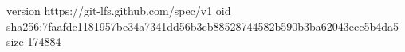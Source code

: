version https://git-lfs.github.com/spec/v1
oid sha256:7faafde1181957be34a7341dd56b3cb88528744582b590b3ba62043ecc5b4da5
size 174884
